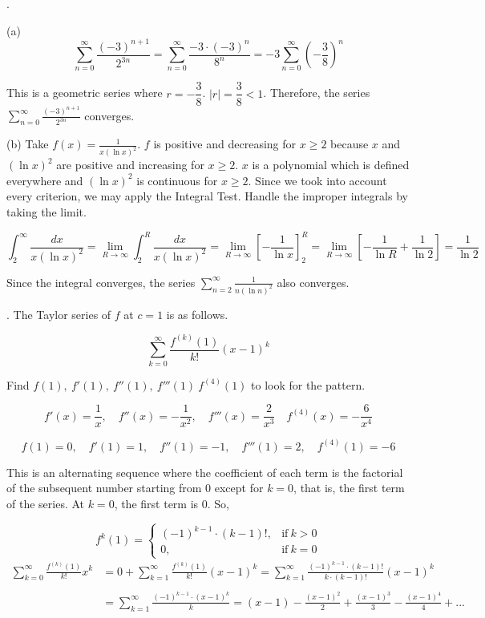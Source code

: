 \documentclass{article}
\begin{document}
\hfill

.

\hfill

\noindent (a)
\[\sum_{n=0}^{\infty}\frac{(-3)^{n+1}}{2^{3n}}=\sum_{n=0}^{\infty}\frac{-3\cdot(-3)^n}{8^n}=-3\sum_{n=0}^{\infty}\left(-\frac38\right)^n\]

\hfill

\noindent This is a geometric series where $r=-\dfrac38$. $|r|=\dfrac38<1$. Therefore, the series $\displaystyle\sum_{n=0}^{\infty}\frac{(-3)^{n+1}}{2^{3n}}$ converges.

\hfill

\noindent (b) Take $\displaystyle f(x)=\frac1{x(\ln x)^2}$. $f$ is positive and decreasing for $x\geq2$ because $x$ and $(\ln x)^2$ are positive and increasing for $x\geq2$. $x$ is a polynomial which is defined everywhere and $(\ln x)^2$ is continuous for $x\geq2$. Since we took into account every criterion, we may apply the Integral Test. Handle the improper integrals by taking the limit.

\[\int_2^{\infty}\frac{dx}{x(\ln x)^2}=\lim_{R\to\infty}\int_2^R\frac{dx}{x(\ln x)^2}=\lim_{R\to\infty}\left[-\frac1{\ln x}\right]_2^R=\lim_{R\to\infty}\left[-\frac1{\ln R}+\frac1{\ln2}\right]=\frac1{\ln 2}\]

\hfill

\noindent Since the integral converges, the series $\displaystyle\sum_{n=2}^\infty\frac1{n(\ln n)^2}$ also converges.

\hfill

. The Taylor series of $f$ at $c=1$ is as follows.

\[\sum_{k=0}^{\infty}\frac{f^{(k)}(1)}{k!}(x-1)^k\]

\hfill

\noindent Find $f(1),\:f'(1),\:f''(1),\:f'''(1)\:f^{(4)}(1)$ to look for the pattern.

\[f'(x)=\frac1{x},\quad f''(x)=-\frac1{x^2},\quad f'''(x)=\frac2{x^3}\quad f^{(4)}(x)=-\frac6{x^4} \]

\[f(1)=0,\quad f'(1)=1,\quad f''(1)=-1,\quad f'''(1)=2,\quad f^{(4)}(1)=-6\]

\hfill

\noindent This is an alternating sequence where the coefficient of each term is the factorial of the subsequent number starting from $0$ except for $k=0$, that is, the first term of the series. At $k=0$, the first term is $0$. So,

\[f^{k}(1)=\left\{\begin{array}{ll}(-1)^{k-1}\cdot (k-1)!,&\text{if}\: k>0\\0,& \text{if}\:k=0\end{array}\right.\]
\begin{align*}\sum_{k=0}^{\infty}\frac{f^{(k)}(1)}{k!}x^k&=0+\sum_{k=1}^{\infty}\frac{f^{(k)}(1)}{k!}(x-1)^k=\sum_{k=1}^{\infty}\frac{(-1)^{k-1}\cdot(k-1)!}{k\cdot(k-1)!}(x-1)^k\\\\&=\boxed{\sum_{k=1}^{\infty}\frac{(-1)^{k-1}\cdot(x-1)^k}{k}=(x-1)-\frac{(x-1)^2}2+\frac{(x-1)^3}3-\frac{(x-1)^4}4+...}\end{align*}
\end{document}
